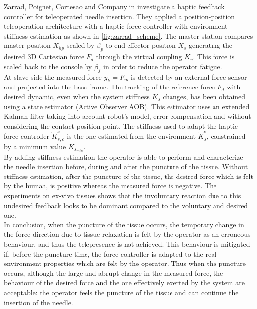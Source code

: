 Zarrad, Poignet, Cortesao and Company in \cite{Zarrad2007} investigate a haptic feedback controller for teleoperated needle insertion.
They applied a position-position teleoperation architecture with a haptic force controller with environment stiffness estimation as shown in \figurename{ \ref{fig:zarrad_scheme}}. The master station compares master position $X_{hp}$ scaled by $\beta_{p}$ to end-effector position $X_{s}$ generating the desired 3D Cartesian force $F_{d} $ through the virtual coupling $K_{v}$.
This force is scaled back to the console by $\beta_{f}$ in order to reduce the operator fatigue.\\
At slave side the measured force $y_{k} = F_{m}$ is detected by an external force sensor and projected into the base frame.
The tracking of the reference force $F_{d}$ with desired dynamic, even when the system stiffness $K_{s}$ changes, has been obtained using a state estimator (Active Observer AOB). This estimator uses an extended Kalman filter taking into account robot's model, error compensation and without considering the contact position point. The stiffness used to adapt the haptic force controller $\hat{K}^{e}_{s,c}$ is the one estimated from the environment $\hat{K}^{e}_{s}$, constrained by a minimum value $K_{s_{min}}$.\\
By adding stiffness estimation the operator is able to perform and characterize the needle insertion before, during and after the puncture of the tissue.
Without stiffness estimation, after the puncture of the tissue, the desired force which is felt by the human, is positive whereas the measured force is negative.
The experiments on ex-vivo tissues shows that the involuntary reaction due to this undesired feedback looks to be dominant compared to the voluntary and desired one.\\
In conclusion, when the puncture of the tissue occurs, the temporary change in the force direction due to tissue relaxation is felt by the operator as an erroneous behaviour, and thus the telepresence is not achieved.
This behaviour is mitigated if, before the puncture time, the force controller is adapted to the real environment properties which are felt by the operator.
Thus when the puncture occurs, although the large and abrupt change in the measured force, the behaviour of the desired force and the one effectively exerted by the system are acceptable: the operator feels the puncture of the tissue and can continue the insertion of the needle.

